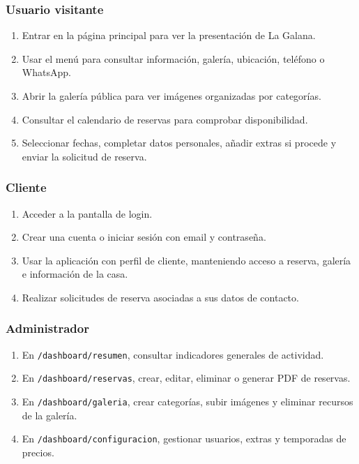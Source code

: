 \documentclass[11pt,a4paper]{article}
\begin{document}
\subsubsection{Usuario visitante}
\begin{enumerate}[leftmargin=1.4cm]
  \item Entrar en la página principal para ver la presentación de La Galana.
  \item Usar el menú para consultar información, galería, ubicación, teléfono o WhatsApp.
  \item Abrir la galería pública para ver imágenes organizadas por categorías.
  \item Consultar el calendario de reservas para comprobar disponibilidad.
  \item Seleccionar fechas, completar datos personales, añadir extras si procede y enviar la solicitud de reserva.
\end{enumerate}

\subsubsection{Cliente}
\begin{enumerate}[leftmargin=1.4cm]
  \item Acceder a la pantalla de login.
  \item Crear una cuenta o iniciar sesión con email y contraseña.
  \item Usar la aplicación con perfil de cliente, manteniendo acceso a reserva, galería e información de la casa.
  \item Realizar solicitudes de reserva asociadas a sus datos de contacto.
\end{enumerate}

\subsubsection{Administrador}
\begin{enumerate}[leftmargin=1.4cm]
  \item En \texttt{/dashboard/resumen}, consultar indicadores generales de actividad.
  \item En \texttt{/dashboard/reservas}, crear, editar, eliminar o generar PDF de reservas.
  \item En \texttt{/dashboard/galeria}, crear categorías, subir imágenes y eliminar recursos de la galería.
  \item En \texttt{/dashboard/configuracion}, gestionar usuarios, extras y temporadas de precios.
\end{enumerate}
\end{document}

